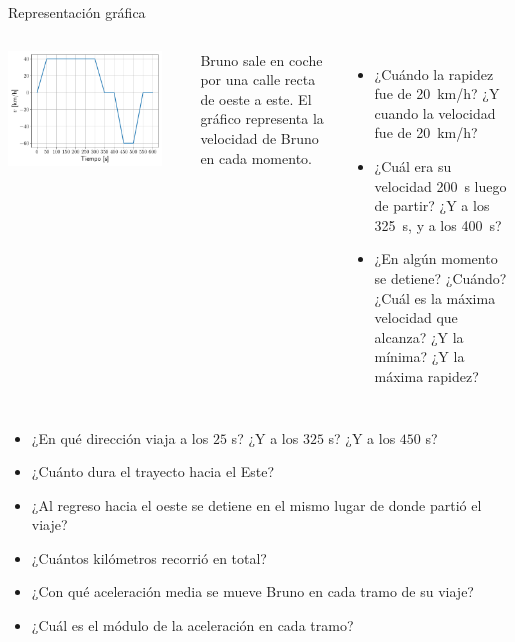 \documentclass[9pt, aspectratio=169]{beamer}
\begin{document}
\begin{frame}{Representación gráfica}
\begin{columns}
\cx
\begin{center}
    \includegraphics[width=0.9\textwidth]{figs/bruno-2.pdf}
\end{center}
\cx
Bruno sale en coche por una calle recta de oeste a este. El gráfico representa la velocidad de Bruno en cada momento.
{\small 
\begin{itemize}
    \item ¿Cuándo la rapidez fue de \qty{20}{km/h}? ¿Y cuando la velocidad fue de \qty{20}{km/h}?
    \item ¿Cuál era su velocidad \qty{200}{s} luego de partir? ¿Y a los \qty{325}{s}, y a los \qty{400}{s}?
 \item ¿En algún momento se detiene? ¿Cuándo? ¿Cuál es la máxima velocidad que alcanza? ¿Y la mínima? ¿Y la máxima rapidez?
\end{itemize}
}
\end{columns}
\begin{multicols}{2}
{ \small
\begin{itemize}
 \item ¿En qué dirección viaja a los $25$ s? ¿Y a los $325$ s? ¿Y a los $450$ s?
 \item ¿Cuánto dura el trayecto hacia el Este?
 \item ¿Al regreso hacia el oeste se detiene en el mismo lugar de donde partió el viaje?
 \item ¿Cuántos kilómetros recorrió en total?
 \item ¿Con qué aceleración media se mueve Bruno en cada tramo de su viaje?
 \item ¿Cuál es el módulo de la aceleración en cada tramo?
\end{itemize}
}
\end{multicols}
\end{frame}
\end{document}
